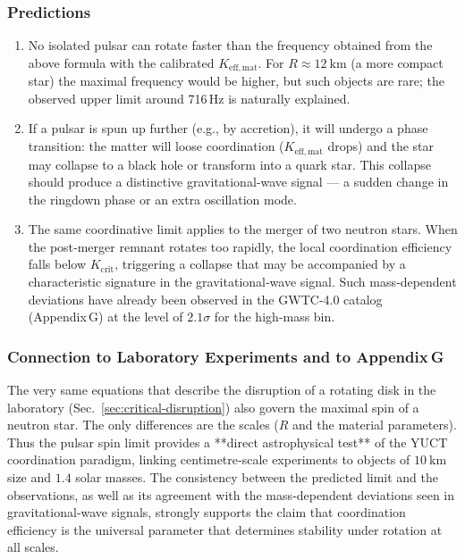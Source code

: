 \documentclass[12pt,a4paper]{article}
\begin{document}
	\subsubsection{Predictions}
	
	\begin{enumerate}
		\item No isolated pulsar can rotate faster than the frequency obtained from the above formula with the calibrated \(K_{\mathrm{eff,mat}}\). For \(R\approx 12\ \text{km}\) (a more compact star) the maximal frequency would be higher, but such objects are rare; the observed upper limit around 716 Hz is naturally explained.
		\item If a pulsar is spun up further (e.g., by accretion), it will undergo a phase transition: the matter will loose coordination (\(K_{\mathrm{eff,mat}}\) drops) and the star may collapse to a black hole or transform into a quark star. This collapse should produce a distinctive gravitational‑wave signal — a sudden change in the ringdown phase or an extra oscillation mode.
		\item The same coordinative limit applies to the merger of two neutron stars. When the post‑merger remnant rotates too rapidly, the local coordination efficiency falls below \(K_{\mathrm{crit}}\), triggering a collapse that may be accompanied by a characteristic signature in the gravitational‑wave signal. Such mass‑dependent deviations have already been observed in the GWTC‑4.0 catalog (Appendix G) at the level of \(2.1\sigma\) for the high‑mass bin.
	\end{enumerate}
	
	\subsubsection{Connection to Laboratory Experiments and to Appendix G}
	
	The very same equations that describe the disruption of a rotating disk in the laboratory (Sec.~\ref{sec:critical-disruption}) also govern the maximal spin of a neutron star. The only differences are the scales (\(R\) and the material parameters). Thus the pulsar spin limit provides a **direct astrophysical test** of the YUCT coordination paradigm, linking centimetre‑scale experiments to objects of \(10\ \text{km}\) size and \(1.4\) solar masses. The consistency between the predicted limit and the observations, as well as its agreement with the mass‑dependent deviations seen in gravitational‑wave signals, strongly supports the claim that coordination efficiency is the universal parameter that determines stability under rotation at all scales.
	
\end{document}
